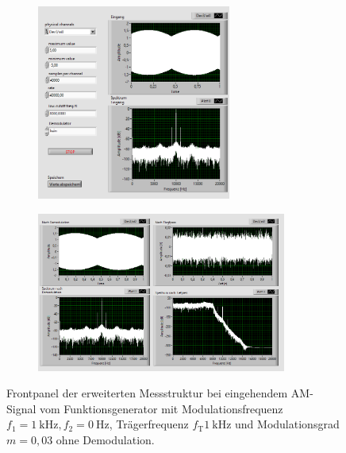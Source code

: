		\newpage
		\pagestyle{empty}
		\begin{figure}[H]
			\centering
			\begin{subfigure}[c]{\textwidth}
				\centering
				\includegraphics[width=0.7\textwidth]{pic/dam_keine1.png}
			\end{subfigure}
			\begin{subfigure}[c]{\textwidth}
				\centering
				\includegraphics[width=0.9\textwidth]{pic/dam_keine2.png}
			\end{subfigure}	
			\caption{Frontpanel der erweiterten Messstruktur bei eingehendem AM-Signal vom Funktionsgenerator mit Modulationsfrequenz $f_1= \SI{1}{\kilo\hertz}, f_2 = \SI{0}{\hertz}$, Trägerfrequenz $f_\text{T}\SI{1}{\kilo\hertz}$ und Modulationsgrad $m = 0,03$ ohne Demodulation.}
			\label{fig:dam_keine}	
		\end{figure} 
	
